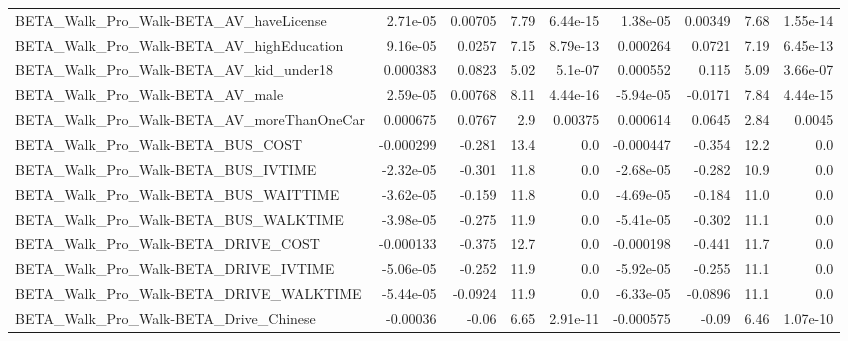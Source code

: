 \begin{tabular}{lrrrrrrrr}
BETA\_Walk\_Pro\_Walk-BETA\_AV\_haveLicense             &    2.71e-05 &      0.00705 &     7.79 & 6.44e-15 &   1.38e-05 &     0.00349 &         7.68 &      1.55e-14 \\
BETA\_Walk\_Pro\_Walk-BETA\_AV\_highEducation           &    9.16e-05 &       0.0257 &     7.15 & 8.79e-13 &   0.000264 &      0.0721 &         7.19 &      6.45e-13 \\
BETA\_Walk\_Pro\_Walk-BETA\_AV\_kid\_under18             &    0.000383 &       0.0823 &     5.02 &  5.1e-07 &   0.000552 &       0.115 &         5.09 &      3.66e-07 \\
BETA\_Walk\_Pro\_Walk-BETA\_AV\_male                    &    2.59e-05 &      0.00768 &     8.11 & 4.44e-16 &  -5.94e-05 &     -0.0171 &         7.84 &      4.44e-15 \\
BETA\_Walk\_Pro\_Walk-BETA\_AV\_moreThanOneCar          &    0.000675 &       0.0767 &      2.9 &  0.00375 &   0.000614 &      0.0645 &         2.84 &        0.0045 \\
BETA\_Walk\_Pro\_Walk-BETA\_BUS\_COST                   &   -0.000299 &       -0.281 &     13.4 &      0.0 &  -0.000447 &      -0.354 &         12.2 &           0.0 \\
BETA\_Walk\_Pro\_Walk-BETA\_BUS\_IVTIME                 &   -2.32e-05 &       -0.301 &     11.8 &      0.0 &  -2.68e-05 &      -0.282 &         10.9 &           0.0 \\
BETA\_Walk\_Pro\_Walk-BETA\_BUS\_WAITTIME               &   -3.62e-05 &       -0.159 &     11.8 &      0.0 &  -4.69e-05 &      -0.184 &         11.0 &           0.0 \\
BETA\_Walk\_Pro\_Walk-BETA\_BUS\_WALKTIME               &   -3.98e-05 &       -0.275 &     11.9 &      0.0 &  -5.41e-05 &      -0.302 &         11.1 &           0.0 \\
BETA\_Walk\_Pro\_Walk-BETA\_DRIVE\_COST                 &   -0.000133 &       -0.375 &     12.7 &      0.0 &  -0.000198 &      -0.441 &         11.7 &           0.0 \\
BETA\_Walk\_Pro\_Walk-BETA\_DRIVE\_IVTIME               &   -5.06e-05 &       -0.252 &     11.9 &      0.0 &  -5.92e-05 &      -0.255 &         11.1 &           0.0 \\
BETA\_Walk\_Pro\_Walk-BETA\_DRIVE\_WALKTIME             &   -5.44e-05 &      -0.0924 &     11.9 &      0.0 &  -6.33e-05 &     -0.0896 &         11.1 &           0.0 \\
BETA\_Walk\_Pro\_Walk-BETA\_Drive\_Chinese              &    -0.00036 &        -0.06 &     6.65 & 2.91e-11 &  -0.000575 &       -0.09 &         6.46 &      1.07e-10 \\

\end{tabular}
